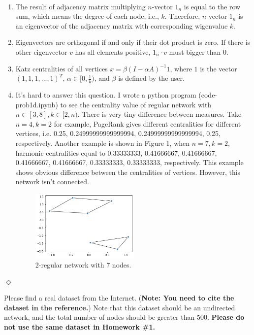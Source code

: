 \documentclass[12pt]{article}
\newcommand {\bsolution}{\noindent {\em Solution:} \ }
\newcommand{\esolution}{\hfill $\Diamond$ \\ \vspace{.3cm}}
\begin{document}
\bsolution
\begin{enumerate}[label=(\alph*)]
	\item The result of adjacency matrix multiplying $n$-vector $1_n$ is equal to the row sum, which means the degree of each node, i.e., $k$. Therefore, $n$-vector $1_n$ is an eigenvector of the adjacency matrix with corresponding wigenvalue $k$.
	\item Eigenvectors are orthogonal if and only if their dot product is zero. If there is other eigenvector $v$ has all elements positive, $1_n \cdot v$ must bigger than 0.
	\item Katz centralities of all vertices $x=\beta (I-\alpha A)^{-1} 1$, where $1$ is the vector $(1, 1, 1, ..., 1)^T$, $\alpha\in [0, \frac{1}{k})$, and $\beta$ is defined by the user.
	\item It's hard to answer this question. I wrote a python program (code-prob1d.ipynb) to see the centrality value of regular network with $n\in [3, 8], k\in [2, n)$. There is very tiny difference between measures. Take $n=4, k=2$ for example, PageRank gives different centralities for different vertices, i.e. 0.25, 0.24999999999999994, 0.24999999999999994, 0.25, respectively. Another example is shown in Figure 1, when $n=7, k=2$, harmonic centralities equal to 0.33333333, 0.41666667, 0.41666667, 0.41666667, 0.41666667, 0.33333333,	0.33333333, respectively. This example shows obvious difference between the centralities of vertices. However, this network isn't connected.
	\begin{figure}[h]
		\centering
		\includegraphics[width=0.5\textwidth]{fig-prob1d.png}
		\caption{2-regular network with 7 nodes.}
		\label{HW2_1}
	\end{figure}
\end{enumerate}
\esolution



\newpage
Please find a real dataset from the Internet. ({\bf Note: You need to cite the dataset in the reference.}) Note that this dataset should be an undirected network, and the total number of nodes should be greater than $500$. {\bf Please do not use the same dataset in Homework \#1.}
\end{document}
